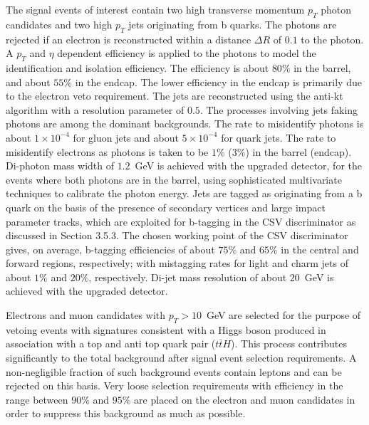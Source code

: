 The signal events of interest contain two high transverse momentum $p_{T}$ photon candidates and two high $p_{T}$ jets originating from b quarks. The photons are rejected if an electron is reconstructed within a distance $\Delta R$ of $0.1$ to the photon.  A $p_{T}$ and $\eta$ dependent efficiency is applied to the photons to model the identification and isolation efficiency. The efficiency is about $80\%$ in the barrel, and about $55\%$ in the endcap. The lower efficiency in the endcap is primarily due to the electron veto requirement.  The jets are reconstructed using the anti-kt algorithm with a resolution parameter of $0.5$. The processes involving jets faking photons are among the dominant backgrounds. The rate to misidentify photons is about $1 \times 10^{-4}$ for gluon jets and about $5\times 10^{-4}$ for quark jets. The rate to misidentify electrons as photons is taken to be $1\%$ ($3\%$) in the barrel (endcap). Di-photon mass width of $1.2$~GeV is achieved with the upgraded detector, for the events where both photons are in the barrel, using sophisticated multivariate techniques to calibrate the photon energy.  Jets are tagged as originating from a b quark on the basis of the presence of secondary vertices and large impact parameter tracks, which are exploited for b-tagging in the CSV discriminator as discussed in Section 3.5.3. The chosen working point of the CSV discriminator gives, on average, b-tagging efficiencies of about $75\%$ and $65\%$ in the central and forward regions, respectively; with mistagging rates for light and charm jets of about $1\%$ and $20\%$, respectively. Di-jet mass resolution of about $20$~GeV is achieved with the upgraded detector. 

Electrons and muon candidates with $p_{T}>10$~GeV are selected for the purpose of vetoing events with signatures consistent with a Higgs boson produced in association with a top and anti top quark pair ($t\bar{t}H$). This process contributes significantly to the total background after signal event selection requirements. A non-negligible fraction of such background events contain leptons and can be rejected on this basis. Very loose selection requirements with efficiency in the range between $90\%$ and $95\%$ are placed on the electron and muon candidates in order to suppress this background as much as possible.

